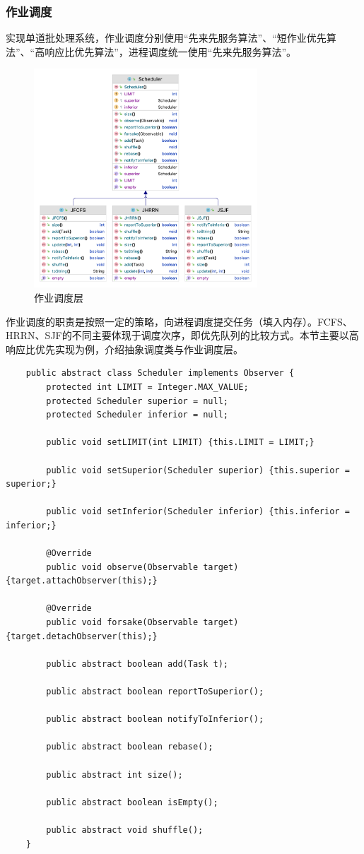 \documentclass[12pt, a4paper, UTF8]{ctexart}
\begin{document}
\newpage
\subsubsection{作业调度}
实现单道批处理系统，作业调度分别使用“先来先服务算法”、“短作业优先算法”、“高响应比优先算法”，进程调度统一使用“先来先服务算法”。

\begin{figure}[htbp]
    \centering
    \includegraphics[height=232.5pt]{t1-class.png}
    \caption{作业调度层}
\end{figure}

作业调度的职责是按照一定的策略，向进程调度提交任务（填入内存）。FCFS、HRRN、SJF的不同主要体现于调度次序，即优先队列的比较方式。本节主要以高响应比优先实现为例，介绍抽象调度类与作业调度层。

\begin{verbatim}
    public abstract class Scheduler implements Observer {
        protected int LIMIT = Integer.MAX_VALUE;
        protected Scheduler superior = null;
        protected Scheduler inferior = null;
    
        public void setLIMIT(int LIMIT) {this.LIMIT = LIMIT;}
    
        public void setSuperior(Scheduler superior) {this.superior = superior;}
    
        public void setInferior(Scheduler inferior) {this.inferior = inferior;}
    
        @Override
        public void observe(Observable target) {target.attachObserver(this);}
    
        @Override
        public void forsake(Observable target) {target.detachObserver(this);}
    
        public abstract boolean add(Task t);
    
        public abstract boolean reportToSuperior();
    
        public abstract boolean notifyToInferior();
    
        public abstract boolean rebase();
    
        public abstract int size();
    
        public abstract boolean isEmpty();
    
        public abstract void shuffle();
    }
\end{verbatim}
\end{document}
